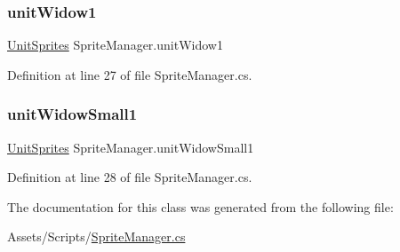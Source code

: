 \subsubsection{\texorpdfstring{unitWidow1}{unitWidow1}}
{\footnotesize\ttfamily \mbox{\hyperlink{class_unit_sprites}{Unit\+Sprites}} Sprite\+Manager.\+unit\+Widow1}



Definition at line 27 of file Sprite\+Manager.\+cs.

\mbox{\label{class_sprite_manager_af903c428c3cef263662f32fe5e183b6f}} 
\subsubsection{\texorpdfstring{unitWidowSmall1}{unitWidowSmall1}}
{\footnotesize\ttfamily \mbox{\hyperlink{class_unit_sprites}{Unit\+Sprites}} Sprite\+Manager.\+unit\+Widow\+Small1}



Definition at line 28 of file Sprite\+Manager.\+cs.



The documentation for this class was generated from the following file\+:\begin{DoxyCompactItemize}
\item 
Assets/\+Scripts/\mbox{\hyperlink{_sprite_manager_8cs}{Sprite\+Manager.\+cs}}\end{DoxyCompactItemize}
